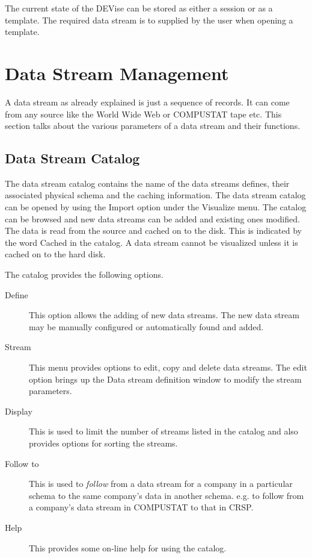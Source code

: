 The current state of the DEVise can be stored as either a session or
as a template. The required data stream is to supplied by the user
when opening a template.

\section{Data Stream Management}

A data stream as already explained is just a sequence of records. It
can come from any source like the World Wide Web or COMPUSTAT tape
etc. This section talks about the various parameters of a data stream
and their functions.

\subsection{Data Stream Catalog}

The data stream catalog contains the name of the data streams defines,
their associated physical schema and the caching information. The data
stream catalog can be opened by using the Import option under the
Visualize menu. The catalog can be browsed and new data streams can be
added and existing ones modified. The data is read from the source and
cached on to the disk. This is indicated by the word Cached in the
catalog. A data stream cannot be visualized unless it is cached on to
the hard disk.

The catalog provides the following options.
\begin{description}
\item[Define] This option allows the adding of new data streams. The
new data stream may be manually configured or automatically found and
added.
\item[Stream] This menu provides options to edit, copy and delete data
streams. The edit option brings up the Data stream definition window
to modify the stream parameters.
\item[Display] This is used to limit the number of streams listed in
the catalog and also provides options for sorting the streams.
\item[Follow to] This is used to {\em follow} from a data stream for
a company in a particular schema to the same company's data in another
schema. e.g. to follow from a company's data stream in COMPUSTAT to
that in CRSP.
\item[Help] This provides some on-line help for using the catalog.
\end{description}

